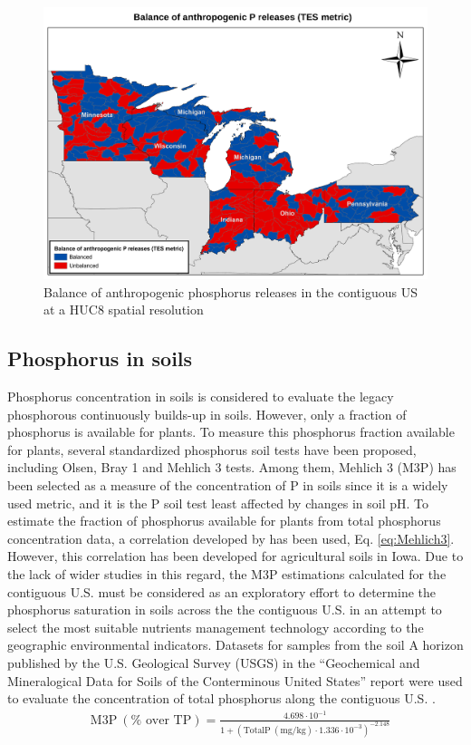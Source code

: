 \documentclass[10pt,a4paper]{article}
\begin{document}
\begin{figure}[H]
	\centering
	\includegraphics[width=0.95\linewidth, trim={0cm 0cm 0cm 0cm},clip]{BalanceofP.pdf} 
	\caption{Balance of anthropogenic phosphorus releases in the contiguous US at a HUC8 spatial resolution}
	\label{fig:TECmap}
\end{figure}

\subsection{Phosphorus in soils}
Phosphorus concentration in soils is considered to evaluate the legacy phosphorous continuously builds-up in soils. However, only a fraction of phosphorus is available for plants. To measure this phosphorus fraction available for plants, several standardized phosphorus soil tests have been proposed, including Olsen, Bray 1 and Mehlich 3 tests. Among them,  Mehlich 3 (M3P) has been selected as a measure of the concentration of P in soils since it is a widely used metric, and it is the P soil test least affected by changes in soil pH. To estimate the fraction of phosphorus available for plants from total phosphorus concentration data, a correlation developed by  has been used, Eq. \ref{eq:Mehlich3}. However, this correlation has been developed for agricultural soils in Iowa. Due to the lack of wider studies in this regard, the M3P estimations calculated for the contiguous U.S. must be considered as an exploratory effort to determine the phosphorus saturation in soils across the the contiguous U.S. in an attempt to select the most suitable nutrients management technology according to the geographic environmental indicators. Datasets for samples from the soil A horizon published by the U.S. Geological Survey (USGS) in the ``Geochemical and Mineralogical Data for Soils of the Conterminous United States'' report were used to evaluate the concentration of total phosphorus along the contiguous U.S. .
\begin{align}
	& \text{M3P} \ (\% \text{ over TP}) = \frac{4.698 \cdot 10^{-1}}{1+\left(\text{TotalP} \ (\text{mg}/\text{kg}) \cdot 1.336 \cdot 10^{-3}\right)^{-2.148}} \label{eq:Mehlich3}
\end{align}
\end{document}
